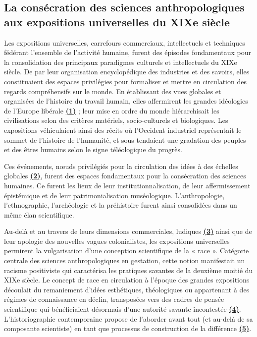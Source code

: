 \documentclass{article}
\begin{document}
	\subsection{La consécration des sciences anthropologiques aux expositions universelles du XIXe siècle}
	
	Les expositions universelles, carrefours commerciaux, intellectuels et techniques fédérant l’ensemble de l’activité humaine, furent des épisodes fondamentaux pour la consolidation des principaux paradigmes culturels et intellectuels du XIXe siècle. De par leur organisation encyclopédique des industries et des savoirs, elles constituaient des espaces privilégies pour formaliser et mettre en circulation des regards compréhensifs sur le monde. En établissant des vues globales et organisées de l’histoire du travail humain, elles affermirent les grandes idéologies de l’Europe libérale \underline{\textbf{(1)}} ; leur mise en ordre du monde hiérarchisait les civilisations selon des critères matériels, socio-culturels et biologiques. Les expositions véhiculaient ainsi des récits où l’Occident industriel représentait le sommet de l’histoire de l’humanité, et sous-tendaient une gradation des peuples et des êtres humains selon le signe téléologique du progrès.
	
	Ces événements, nœuds privilégiés pour la circulation des idées à des échelles globales \textbf{\underline{(2)}}, furent des espaces fondamentaux pour la consécration des sciences humaines. Ce furent les lieux de leur institutionnalisation, de leur affermissement épistémique et de leur patrimonialisation muséologique. L’anthropologie, l’ethnographie, l’archéologie et la préhistoire furent ainsi consolidées dans un même élan scientifique.
	
	Au-delà et au travers de leurs dimensions commerciales, ludiques \textbf{\underline{(3)}} ainsi que de leur apologie des nouvelles vagues colonialistes, les expositions universelles permirent la vulgarisation d’une conception scientifique de la « race ». Catégorie centrale des sciences anthropologiques en gestation, cette notion manifestait un racisme positiviste qui caractérisa les pratiques savantes de la deuxième moitié du XIXe siècle. Le concept de race en circulation à l’époque des grandes expositions découlait du remaniement d’idées esthétiques, théologiques ou appartenant à des régimes de connaissance en déclin, transposées vers des cadres de pensée scientifique qui bénéficiaient désormais d’une autorité savante incontestée \textbf{\underline{(4)}}. L’historiographie contemporaine propose de l’aborder avant tout (et au-delà de sa composante scientiste) en tant que processus de construction de la différence \textbf{\underline{(5)}}.
	
\end{document}
